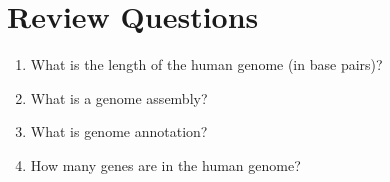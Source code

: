 \documentclass[]{book}
\providecommand{\tightlist}{%
  \setlength{\itemsep}{0pt}\setlength{\parskip}{0pt}}
\begin{document}
\section{Review Questions}\label{review-questions-10}

\begin{enumerate}
\def\labelenumi{\arabic{enumi}.}
\tightlist
\item
  What is the length of the human genome (in base pairs)?
\item
  What is a genome assembly?
\item
  What is genome annotation?
\item
  How many genes are in the human genome?
\end{enumerate}
\end{document}
